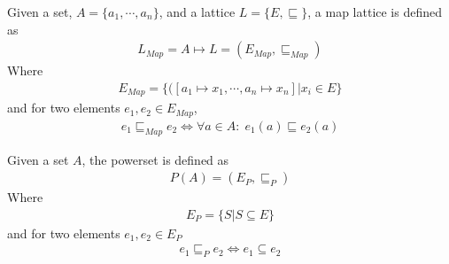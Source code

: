 \begin{definition}
Given a set, $A = \{a_1, \cdots, a_n\}$, and a lattice $L = \{E, \sqsubseteq\}$, a map lattice is defined as
\begin{align}
L_{Map} = A \mapsto L = (E_{Map}, \sqsubseteq_{Map}) 
\end{align}
Where 
\begin{align}
E_{Map} = \{([a_1 \mapsto x_1, \cdots, a_n\mapsto x_n] | x_i \in E\}
\end{align}
and for two elements $e_1, e_2 \in E_{Map}$, 
\begin{align}
e_1 \sqsubseteq_{Map} e_2 \Leftrightarrow \forall a\in A:\; e_1(a) \sqsubseteq e_2(a)
\end{align}

\end{definition}


\begin{definition}
Given a set $A$, the powerset is defined as
\begin{align}
P(A) = (E_P, \sqsubseteq_P) 
\end{align}
Where 
\begin{align}
E_P = \{S  | S \subseteq E\}
\end{align}
and for two elements $e_1, e_2 \in E_P$
\begin{align}
e_1 \sqsubseteq_P e_2 \Leftrightarrow e_1 \subseteq e_2
\end{align}

\end{definition}

